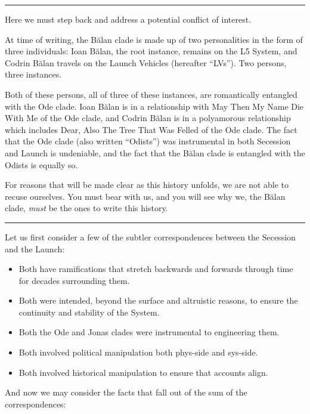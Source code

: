 \begin{center}\rule{0.5\linewidth}{0.5pt}\end{center}

Here we must step back and address a potential conflict of interest.

At time of writing, the Bălan clade is made up of two personalities in the form of three individuals: Ioan Bălan, the root instance, remains on the L5 System, and Codrin Bălan travels on the Launch Vehicles (hereafter ``LVs''). Two persons, three instances.

Both of these persons, all of three of these instances, are romantically entangled with the Ode clade. Ioan Bălan is in a relationship with May Then My Name Die With Me of the Ode clade, and Codrin Bălan is in a polyamorous relationship which includes Dear, Also The Tree That Was Felled of the Ode clade. The fact that the Ode clade (also written ``Odists'') was instrumental in both Secession and Launch is undeniable, and the fact that the Bălan clade is entangled with the Odists is equally so.

For reasons that will be made clear as this history unfolds, we are not able to recuse ourselves. You must bear with us, and you will see why we, the Bălan clade, \emph{must} be the ones to write this history.

\begin{center}\rule{0.5\linewidth}{0.5pt}\end{center}

Let us first consider a few of the subtler correspondences between the Secession and the Launch:

\begin{itemize}
\tightlist
\item
  Both have ramifications that stretch backwards and forwards through time for decades surrounding them.
\item
  Both were intended, beyond the surface and altruistic reasons, to ensure the continuity and stability of the System.
\item
  Both the Ode and Jonas clades were instrumental to engineering them.
\item
  Both involved political manipulation both phys-side and sys-side.
\item
  Both involved historical manipulation to ensure that accounts align.
\end{itemize}

And now we may consider the facts that fall out of the sum of the correspondences:

